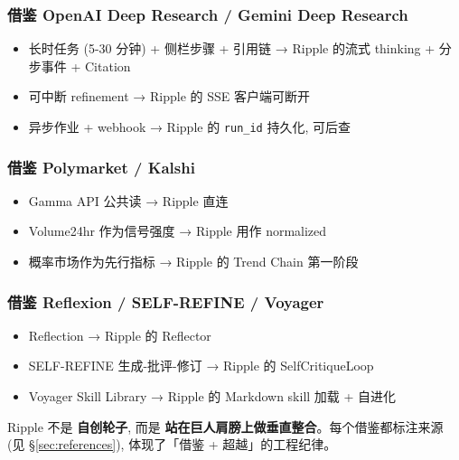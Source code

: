 \subsubsection{借鉴 OpenAI Deep Research / Gemini Deep Research}

\begin{itemize}
    \item 长时任务 (5-30 分钟) + 侧栏步骤 + 引用链 → Ripple 的流式 thinking + 分步事件 + Citation
    \item 可中断 refinement → Ripple 的 SSE 客户端可断开
    \item 异步作业 + webhook → Ripple 的 \texttt{run\_id} 持久化, 可后查
\end{itemize}

\subsubsection{借鉴 Polymarket / Kalshi}

\begin{itemize}
    \item Gamma API 公共读 → Ripple 直连
    \item Volume24hr 作为信号强度 → Ripple 用作 normalized
    \item 概率市场作为先行指标 → Ripple 的 Trend Chain 第一阶段
\end{itemize}

\subsubsection{借鉴 Reflexion / SELF-REFINE / Voyager}

\begin{itemize}
    \item Reflection → Ripple 的 Reflector
    \item SELF-REFINE 生成-批评-修订 → Ripple 的 SelfCritiqueLoop
    \item Voyager Skill Library → Ripple 的 Markdown skill 加载 + 自进化
\end{itemize}

\begin{insight}
Ripple 不是 \textbf{自创轮子}, 而是 \textbf{站在巨人肩膀上做垂直整合}。每个借鉴都标注来源 (见 §\ref{sec:references}), 体现了「借鉴 + 超越」的工程纪律。
\end{insight}
